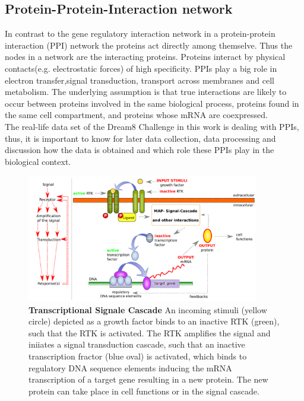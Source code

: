\subsection*{Protein-Protein-Interaction network}
In contrast to the gene regulatory interaction network in a protein-protein interaction (\gls{PPI}) network the proteins act directly among themselve. Thus the nodes in a network are the interacting proteins. Proteins interact by physical contacts(e.g. electrostatic forces) of high specificity. PPIs play a big role in electron transfer,signal transduction, transport across membranes and cell metabolism. The underlying assumption is that true interactions are likely to occur between proteins involved in the same biological process, proteins found in the same cell compartment, and proteins whose mRNA are coexpressed.
\citep{doi:10.1586/14789450.1.2.239}\\
The real-life data set of the Dream8 Challenge in this work is dealing with PPIs, thus, it is important to know for later data collection, data processing and discussion how the data is obtained and which role these PPIs play in the biological context.


\begin{figure}[H]
\captionsetup{width=.9\linewidth}
\centering
\includegraphics[width=0.9\textwidth]{./Bilder/GRNDREAM8.pdf}
\caption[Transcriptional Signale Cascade of RTKs]{\textbf{Transcriptional Signale Cascade} An incoming stimuli (yellow circle) depicted as a growth factor binds to an inactive RTK (green), such that the RTK is activated. The RTK amplifies the signal and iniiates a signal transduction cascade, such that an inactive transcription fractor (blue oval) is activated, which binds to regulatory DNA sequence elements inducing the mRNA transcription of a target gene resulting in a new protein. The new protein can take place in cell functions or in the signal cascade. \citep{https://public.ornl.gov/site/gallery/detail.cfm?id=302&topic=&citation=&general=gene20regulatory20network&restsection=all} }
\label{fig:DREAM8GRN}
\end{figure}

